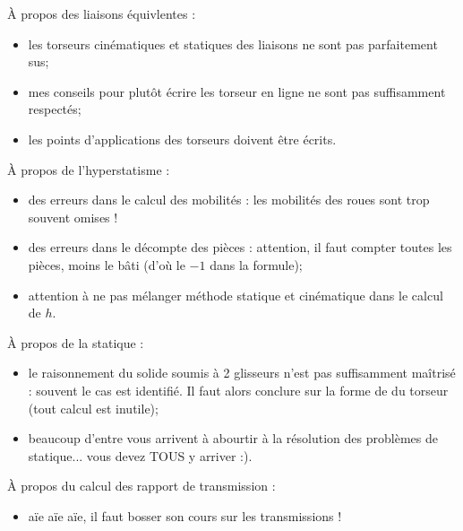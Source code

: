 \documentclass[10pt,fleqn]{book} %
\begin{document}
À propos des liaisons équivlentes :
\begin{itemize}
\item les torseurs cinématiques et statiques des liaisons ne sont pas parfaitement sus;
\item mes conseils pour plutôt écrire les torseur en ligne ne sont pas suffisamment respectés;
\item les points d'applications des torseurs doivent être écrits.
\end{itemize}
À propos de l'hyperstatisme :
\begin{itemize}
\item des erreurs dans le calcul des mobilités : les mobilités des roues sont trop souvent omises !
\item des erreurs dans le décompte des pièces : attention, il faut compter toutes les pièces, moins le bâti (d'où le $-1$ dans la formule);
\item attention à ne pas mélanger méthode statique et cinématique dans le calcul de $h$.
\end{itemize}
À propos de la statique :
\begin{itemize}
\item le raisonnement du solide soumis à 2 glisseurs n'est pas suffisamment maîtrisé : souvent le cas est identifié. Il faut alors conclure sur la forme de du torseur (tout calcul est inutile);
\item beaucoup d'entre vous arrivent  à abourtir à la résolution des problèmes de statique... vous devez TOUS y arriver :).
\end{itemize}
À propos du calcul des rapport de transmission :
\begin{itemize}
\item aïe aïe aïe, il faut bosser son cours sur les transmissions !
\end{itemize}



%
\end{document}
